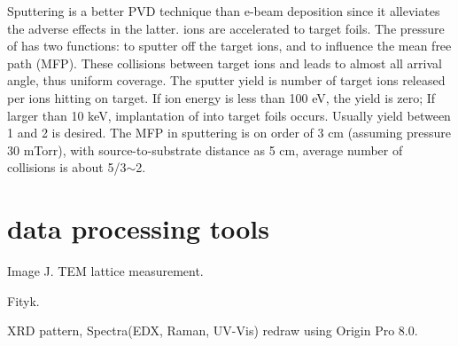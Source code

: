 Sputtering is a better PVD technique than e-beam deposition since it alleviates the adverse effects in the latter.  ions are accelerated to target foils. The pressure of  has two functions: to sputter off the target ions, and to influence the mean free path (MFP). These collisions between target ions and  leads to almost all arrival angle, thus uniform coverage. The sputter yield is number of target ions released per ions hitting on target. If  ion energy is less than 100 eV, the yield is zero; If larger than 10 keV, implantation of  into target foils occurs. Usually yield between 1 and 2 is desired. The MFP in sputtering is on order of 3 cm (assuming pressure 30 mTorr), with source-to-substrate distance as 5 cm, average number of collisions is about 5/3$\sim$2. 


\section{data processing tools}

Image J.\cite{Schneider2012} TEM lattice measurement. 

Fityk. \cite{Wojdyr2010}

XRD pattern, Spectra(EDX, Raman, UV-Vis) redraw using Origin Pro 8.0. 















